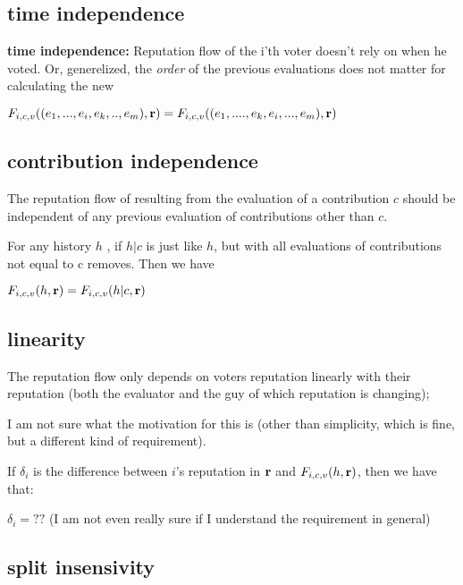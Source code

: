 \documentclass{article}
\begin{document}
\subsection{time independence}

{\bf time independence:} Reputation flow of the i’th voter doesn’t rely on when he voted. Or, generelized, the {\em order} of the previous evaluations does not matter for calculating the new 

\begin{center}
$F_{i,c,v}((e_1, ..., e_i, e_k, .. , e_m), {\bf r}) = F_{i,c,v}((e_1, ...., e_k, e_i, ... , e_m), {\bf r})$
 

\end{center}

\subsection{contribution independence}

The reputation flow of resulting from the evaluation of a contribution $c$ should be independent of any previous evaluation of contributions other than $c$.

For any history $h$ , if $h | c$ is just like $h$, but with all evaluations of contributions not equal to c removes. Then we have

\begin{center}
$F_{i,c,v}(h, {\bf r}) = F_{i,c,v}(h|c, {\bf r}) $
\end{center}

\subsection{linearity}

The  reputation flow only depends on voters reputation linearly with their reputation (both the evaluator and the guy of which reputation is changing);

I am not sure what the motivation for this is (other than simplicity, which is fine, but a different kind of requirement). 

If $\delta_i$ is the difference between $i$'s reputation in ${\bf r}$ and $F_{i,c,v}(h, {\bf r})$, then we have that:
\begin{center}
$\delta_i = ??$ (I am not even really sure if I understand the requirement in general)
\end{center}

\subsection{split insensivity}
\end{document}
